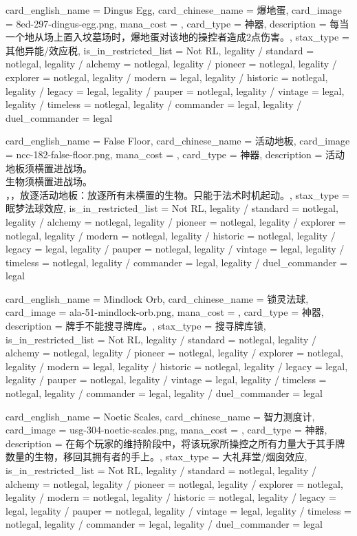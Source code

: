 \documentclass[lang = cn, color = black, 10pt]{AllThatStax}
\begin{document}
\card
{
	card_english_name = {Dingus Egg},
	card_chinese_name = {爆地蛋},
	card_image = 8ed-297-dingus-egg.png,
	mana_cost = ,
	card_type = 神器,
	description = {每当一个地从场上置入坟墓场时，爆地蛋对该地的操控者造成2点伤害。},
	stax_type = 其他异能/效应税,
	is_in_restricted_list = Not RL,
	legality / standard = notlegal,
	legality / alchemy = notlegal,
	legality / pioneer = notlegal,
	legality / explorer = notlegal,
	legality / modern = legal,
	legality / historic = notlegal,
	legality / legacy = legal,
	legality / pauper = notlegal,
	legality / vintage = legal,
	legality / timeless = notlegal,
	legality / commander = legal,
	legality / duel_commander = legal
}

\card
{
	card_english_name = {False Floor},
	card_chinese_name = {活动地板},
	card_image = ncc-182-false-floor.png,
	mana_cost = ,
	card_type = 神器,
	description = {活动地板须横置进战场。\\
生物须横置进战场。\\
，，放逐活动地板：放逐所有未横置的生物。只能于法术时机起动。},
	stax_type = 眠梦法球效应,
	is_in_restricted_list = Not RL,
	legality / standard = notlegal,
	legality / alchemy = notlegal,
	legality / pioneer = notlegal,
	legality / explorer = notlegal,
	legality / modern = notlegal,
	legality / historic = notlegal,
	legality / legacy = legal,
	legality / pauper = notlegal,
	legality / vintage = legal,
	legality / timeless = notlegal,
	legality / commander = legal,
	legality / duel_commander = legal
}

\card
{
	card_english_name = {Mindlock Orb},
	card_chinese_name = {锁灵法球},
	card_image = ala-51-mindlock-orb.png,
	mana_cost = ,
	card_type = 神器,
	description = {牌手不能搜寻牌库。},
	stax_type = 搜寻牌库锁,
	is_in_restricted_list = Not RL,
	legality / standard = notlegal,
	legality / alchemy = notlegal,
	legality / pioneer = notlegal,
	legality / explorer = notlegal,
	legality / modern = legal,
	legality / historic = notlegal,
	legality / legacy = legal,
	legality / pauper = notlegal,
	legality / vintage = legal,
	legality / timeless = notlegal,
	legality / commander = legal,
	legality / duel_commander = legal
}

\card
{
	card_english_name = {Noetic Scales},
	card_chinese_name = {智力测度计},
	card_image = usg-304-noetic-scales.png,
	mana_cost = ,
	card_type = 神器,
	description = {在每个玩家的维持阶段中，将该玩家所操控之所有力量大于其手牌数量的生物，移回其拥有者的手上。},
	stax_type = 大礼拜堂/烟囱效应,
	is_in_restricted_list = Not RL,
	legality / standard = notlegal,
	legality / alchemy = notlegal,
	legality / pioneer = notlegal,
	legality / explorer = notlegal,
	legality / modern = notlegal,
	legality / historic = notlegal,
	legality / legacy = legal,
	legality / pauper = notlegal,
	legality / vintage = legal,
	legality / timeless = notlegal,
	legality / commander = legal,
	legality / duel_commander = legal
}
\end{document}
